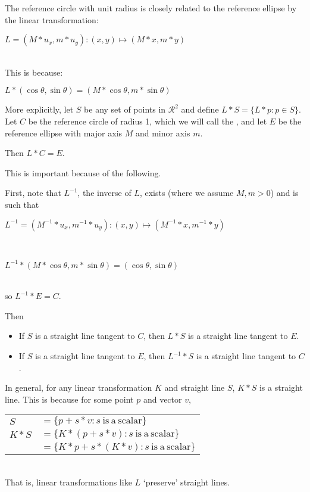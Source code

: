 \documentclass[12pt]{article}
\begin{document}
\medskip

The reference circle with unit radius is closely related to
the reference ellipse by the linear transformation: \\
\centerline{$L = (M*u_x,m*u_y): (x,y) \longmapsto (M*x,m*y)$} \\
This is because: \\
\centerline{$L*(\cos\theta,\sin\theta) = (M*\cos\theta,m*\sin\theta)$}

More explicitly, let $S$ be any set of points in ${\mathcal R}^2$
and define $L * S = \{ L*p: p \in S \}$.
Let $C$ be the reference circle of radius 1, which we will
call the , and let $E$ be the reference
ellipse with major axis $M$ and minor axis $m$.

Then $L*C = E$.

This is important because of the following.

First, note that $L^{-1}$, the inverse of $L$, exists (where we assume
$M,m>0$) and is such that \\
\centerline{$L^{-1} = (M^{-1}*u_x,m^{-1}*u_y): (x,y)
            \longmapsto (M^{-1}*x,m^{-1}*y)$} \\
\centerline{$L^{-1}*(M*\cos\theta,m*\sin\theta) = (\cos\theta,\sin\theta)$} \\
so $L^{-1}*E=C$.

Then
\begin{itemize}
\item If $S$ is a straight line tangent to $C$, then $L*S$ is a straight
line tangent to $E$.
\item If $S$ is a straight line tangent to $E$, then $L^{-1}*S$ is a straight
line tangent to $C$.
\end{itemize}

In general, for any linear transformation $K$ and straight line
$S$, $K*S$ is a straight line.  This is because for some point
$p$ and vector $v$, \\
\hspace*{0.5in}\begin{tabular}{ll}
$S$ & $= \{ p+s*v : s~\mathrm{is~a~scalar}\}$ \\
$K*S$
    & $= \{ K*(p+s*v) : s~\mathrm{is~a~scalar}\}$ \\
    & $= \{ K*p+s*(K*v) : s~\mathrm{is~a~scalar}\}$ \\
\end{tabular} \\
That is, linear transformations like $L$ `preserve' straight lines.
\end{document}
